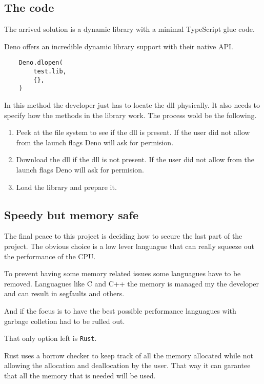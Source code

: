 \documentclass[12pt, letterpaper]{article}
\begin{document}
\begin{multicols}{2}
    \section{The code}

    The arrived solution is a dynamic library with a minimal TypeScript glue code.

    Deno offers an incredible dynamic library support with their native API.

    \begin{lstlisting}
    Deno.dlopen(
        test.lib,
        {},
    )
    \end{lstlisting}

    In this method the developer just has to locate the dll physically. It also needs to specify how the methods in the library work.
    The process wold be the following.

    \begin{enumerate}
        \item Peek at the file system to see if the dll is present. If the user did not allow from the launch flags Deno will ask for permision.
        \item Download the dll if the dll is not present. If the user did not allow from the launch flags Deno will ask for permision.
        \item Load the library and prepare it.
    \end{enumerate}

    \subsection{Speedy but memory safe}

    The final peace to this project is deciding how to secure the last part of the project. The obvious choice is a low lever languague that can really squeeze out the performance of the CPU.

    To prevent having some memory related issues some languagues have to be removed. Languagues like C and C++ the memory is managed my the developer and can result in segfaults and others.

    And if the focus is to have the best possible performance languagues with garbage colletion had to be rulled out.

    That only option left is \verb|Rust|.

    Rust uses a borrow checker to keep track of all the memory allocated while not allowing the allocation and deallocation by the user. That way it can garantee that all the memory that is needed will be used.


\end{multicols}
\end{document}
